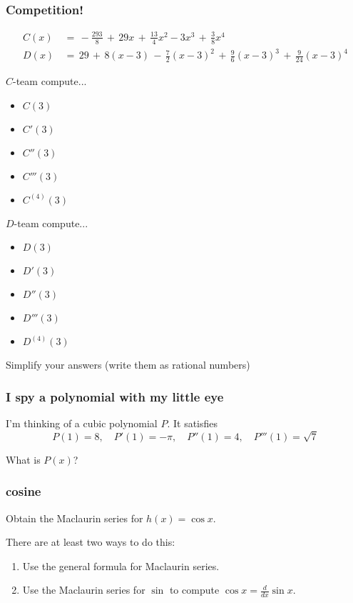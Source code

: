 \documentclass[14pt]{beamer}
\newcommand{\p}{\pause}
\newcommand{\setsize}[1]{\fontsize{#1}{#1}\selectfont} %
\newcommand{\smallerfont}{\setsize{13}} %
\newcommand{\vvv}{\vspace{.2cm}}
\begin{document}
	\begin{frame}[t]
		\frametitle{Competition!}
		\vspace{-.8cm}
		{\smallerfont \begin{align*}C(x)&\, = \, -\frac{293}{8}\, + \, 29x \, + \, \frac{13}{4}x^{2}-3x^{3} \, + \, \frac{3}{8}x^{4} \phantom{\int}\\ D(x)&\, = \, 29 \, + \, 8(x -3) \, - \, \frac{7}{2}(x-3)^{2} \, + \, \frac{9}{6}(x-3)^{3} \, + \, \frac{9}{24}(x-3)^{4}\end{align*} }
		\p
		\vspace{-1cm}

		\begin{multicols}{2}
			$C$-team compute...
			\begin{itemize}
				\item $C(3)$

				\item $C'(3)$

				\item $C''(3)$

				\item $C'''(3)$

				\item $C^{(4)}(3)$
			\end{itemize}

			$D$-team compute...
			\begin{itemize}
				\item $D(3)$

				\item $D'(3)$

				\item $D''(3)$

				\item $D'''(3)$

				\item $D^{(4)}(3)$
			\end{itemize}
		\end{multicols}
		Simplify your answers (write them as rational numbers)
	\end{frame}
	\begin{frame}[t]
		\frametitle{I spy a polynomial with my little eye}

		I'm thinking of a cubic polynomial $P$. It satisfies
		\[
			P(1)=8, \quad P'(1)=-\pi, \quad P''(1) = 4, \quad P'''(1) = \sqrt{7}
		\]

		What is $P(x)$?
	\end{frame}
	\begin{frame}[t]
		\frametitle{cosine}

		Obtain the Maclaurin series for $h(x) = \cos x$.

		There are at least two ways to do this: \vvv
		\begin{enumerate}
			\item Use the general formula for Maclaurin series. \vvv

			\item Use the Maclaurin series for $\sin$ to compute ${\displaystyle \cos x = \frac{d}{dx} \sin x}$.
		\end{enumerate}
	\end{frame}
\end{document}
